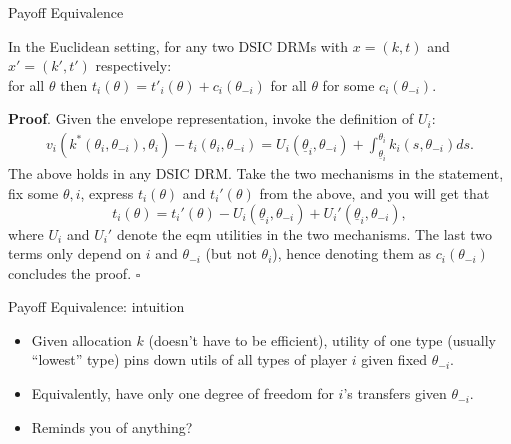 \documentclass[english,10pt
,aspectratio=169
,handout
]{beamer}
\begin{document}
\begin{frame}{Payoff Equivalence}
	\begin{theorem}
		In the Euclidean setting, for any two DSIC DRMs with $x = (k,t)$ and $x' = (k',t')$ respectively:
		\\ 	
		 for all $\theta$ \alert{then $t_i(\theta) = t'_i(\theta) + c_i (\theta_{-i})$} for all $\theta$ for some $c_i(\theta_{-i})$.
	\end{theorem}
	\pause
	\textbf{Proof}. Given the envelope representation, invoke the definition of $U_i$:
	\vspace{-0.5em}\begin{align*}
		v_i(k^*(\theta_i,\theta_{-i}),\theta_i) - t_i(\theta_i,\theta_{-i}) = U_i (\underline{\theta}_i,\theta_{-i}) + \int_{\underline{\theta}_i}^{\theta_i} k_i(s,\theta_{-i}) d s.
	\end{align*}
	The above holds in any DSIC DRM. Take the two mechanisms in the statement, fix some $\theta,i$, express $t_i(\theta)$ and $t_i'(\theta)$ from the above, and you will get that
	\vspace{-0.5em}$$ t_i(\theta) = t_i'(\theta) - U_i (\underline{\theta}_i,\theta_{-i}) + U_i' (\underline{\theta}_i,\theta_{-i}),$$
	where $U_i$ and $U_i'$ denote the eqm utilities in the two mechanisms. The last two terms only depend on $i$ and $\theta_{-i}$ (but not $\theta_i$), hence denoting them as $c_i(\theta_{-i})$ concludes the proof. $\square$
\end{frame}


\begin{frame}{Payoff Equivalence: intuition}
\begin{itemize} 
	\item Given allocation $k$ (doesn't have to be efficient), utility of one type (usually ``lowest'' type) pins down utils of all types of player $i$ given fixed $\theta_{-i}$.
	\pause
	\item Equivalently, have only one degree of freedom for $i$'s transfers given $\theta_{-i}$.
	\item Reminds you of anything?
\end{itemize}
\end{frame}
\end{document}
